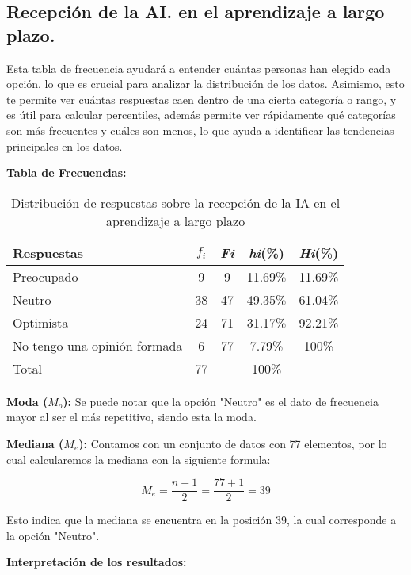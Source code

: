 \subsection{Recepción de la AI. en el aprendizaje a largo plazo.}

Esta tabla de frecuencia ayudará a entender cuántas personas han elegido cada opción, lo que es 
crucial para analizar la distribución de los datos. Asimismo, esto te permite ver cuántas respuestas 
caen dentro de una cierta categoría o rango, y es útil para calcular percentiles, además permite ver 
rápidamente qué categorías son más frecuentes y cuáles son menos, lo que ayuda a identificar las 
tendencias principales en los datos.

\textbf{Tabla de Frecuencias:}

\begin{table}[H]
  \centering
  \renewcommand{\arraystretch}{1.2}
  \begin{tabular}{l c c c c}
    \hline
    {Respuestas} & {\(f_i\)} & \textit{Fi} & \textit{hi}(\%) & \textit{Hi}(\%)\\
    \hline
    Preocupado  & 9  & 9  & 11.69\% & 11.69\%\\
    Neutro      & 38 & 47 & 49.35\% & 61.04\%\\
    Optimista   & 24 & 71 & 31.17\% & 92.21\%\\
    No tengo una opinión formada & 6  & 77 & 7.79\%  & 100\%\\
    \hline
    Total       & 77 &    & 100\%   & \\
    \hline
  \end{tabular}
  \caption{Distribución de respuestas sobre la recepción de la IA en el aprendizaje a largo plazo}
  \label{tabla:recepcionIA}
\end{table}

\textbf{Moda ($M_o$):} Se puede notar que la opción "Neutro" es el dato de frecuencia mayor al ser el más 
repetitivo, siendo esta la moda.

\textbf{Mediana ($M_e$):}  Contamos con un conjunto de datos con 77 elementos, por lo cual calcularemos la 
mediana con la siguiente formula:

\begin{equation*}
  M_e = \frac{n + 1}{2} = \frac{77 + 1}{2} = 39
\end{equation*}

Esto indica que la mediana se encuentra en la posición 39, la cual corresponde a la opción "Neutro".

\textbf{Interpretación de los resultados:}

